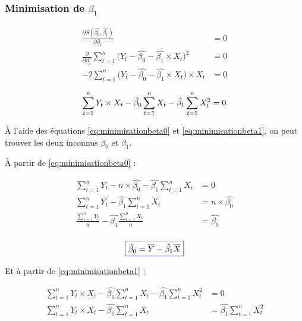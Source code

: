\documentclass[11pt,french]{report}
\begin{document}
\subsubsection*{Minimisation de $\beta_1$}
\begin{align*}
\frac{\partial S(\hat{\beta_0}, \hat{\beta_1})}{\partial \beta_1} &= 0 \\
\frac{\partial}{\partial \beta_1} \sum_{t=1}^n \big( Y_t - \hat{\beta_0} - \hat{\beta_1}\times X_t \big)^2 &= 0 \\
-2\sum_{t=1}^n \big( Y_t - \hat{\beta_0} - \hat{\beta_1} \times X_t \big) \times X_t &= 0 \\
\end{align*}
\begin{equation}
\label{eq:minimisationbeta1}
\sum_{t=1}^n Y_t \times X_t - \hat{\beta_0} \sum_{t=1}^n X_t - \hat{\beta_1} \sum_{t=1}^n X_t^2 = 0 \\
\end{equation}

À l'aide des équations \ref{eq:minimisationbeta0} et \ref{eq:minimisationbeta1}, on peut trouver les deux inconnus $\beta_0$ et $\beta_1$.

À partir de \ref{eq:minimisationbeta0} :

\begin{align*}
\sum_{t=1}^n Y_t - n \times \hat{\beta_0} - \hat{\beta_1} \sum_{t=1}^n X_t &= 0 \\
\sum_{t=1}^n Y_t - \hat{\beta_1} \sum_{t=1}^n X_t &=  n \times \hat{\beta_0} \\
\frac{\sum_{t=1}^n Y_t}{n} - \hat{\beta_1} \frac{\sum_{t=1}^n X_t}{n} &=  \hat{\beta_0} \\
\end{align*}

\begin{equation}
\label{eq:beta0}
\color{blue}
\boxed{\color{black}
\hat{\beta_0} = \overline{Y} - \hat{\beta_1} \overline{X}
}
\end{equation}

Et à partir de \ref{eq:minimisationbeta1} :

\begin{align*}
\sum_{t=1}^n Y_t \times X_t - \hat{\beta_0} \sum_{t=1}^n X_t - \hat{\beta_1} \sum_{t=1}^n X_t^2 &= 0 \\
\sum_{t=1}^n Y_t \times X_t - \hat{\beta_0} \sum_{t=1}^n X_t &=  \hat{\beta_1} \sum_{t=1}^n X_t^2 \\
\end{align*}
\end{document}
